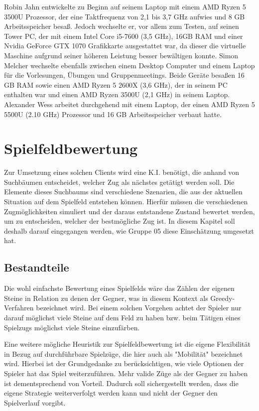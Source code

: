 \documentclass[12pt,a4paper,bibliography=totocnumbered,listof=totocnumbered]{article}
\begin{document}
Robin Jahn entwickelte zu Beginn auf seinem Laptop mit einem AMD Ryzen 5 3500U Prozessor, der eine Taktfrequenz von 2,1 bis 3,7 GHz aufwies und 8 GB Arbeitsspeicher besaß. Jedoch wechselte er, vor allem zum Testen, auf seinen Tower PC, der mit einem Intel Core i5-7600 (3,5 GHz), 16GB RAM und einer Nvidia GeForce GTX 1070 Grafikkarte ausgestattet war, da dieser die virtuelle Maschine aufgrund seiner höheren Leistung besser bewältigen konnte. Simon Melcher wechselte ebenfalls zwischen einem Desktop Computer und einem Laptop für die Vorlesungen, Übungen und Gruppenmeetings. Beide Geräte besaßen 16 GB RAM sowie einen AMD Ryzen 5 2600X (3,6 GHz), der in seinem PC enthalten war und einen AMD Ryzen 3500U (2,1 GHz) in seinem Laptop. Alexander Wess arbeitet durchgehend mit einem Laptop, der einen AMD Ryzen 5 5500U (2.10 GHz) Prozessor und 16 GB Arbeitsspeicher verbaut hatte.

\newpage
\section{Spielfeldbewertung} \label{kap:Spielfeldbewertung}
Zur Umsetzung eines solchen Clients wird eine K.I. benötigt, die anhand von Suchbäumen entscheidet, welcher Zug als nächstes getätigt werden soll. Die Elemente dieses Suchbaums sind verschiedene Szenarien, die aus der aktuellen Situation auf dem Spielfeld entstehen können. Hierfür müssen die verschiedenen Zugmöglichkeiten simuliert und der daraus entstandene Zustand bewertet werden, um zu entscheiden, welcher der bestmögliche Zug ist.
In diesem Kapitel soll deshalb darauf eingegangen werden, wie Gruppe 05 diese Einschätzung umgesetzt hat.

\subsection{Bestandteile}\label{kap:Heuristik_Beschreibung}
Die wohl einfachste Bewertung eines Spielfelds wäre das Zählen der eigenen Steine in Relation zu denen der Gegner, was in diesem Kontext als Greedy-Verfahren bezeichnet wird. Bei einem solchen Vorgehen achtet der Spieler nur darauf möglichst viele Steine auf dem Feld zu haben bzw. beim Tätigen eines Spielzugs möglichst viele Steine einzufärben.

Eine weitere mögliche Heuristik zur Spielfeldbewertung ist die eigene Flexibilität in Bezug auf durchführbare Spielzüge, die hier auch als "Mobilität" bezeichnet wird. Hierbei ist der Grundgedanke zu berücksichtigen, wie viele Optionen der Spieler hat das Spiel weiterzuführen. Mehr valide Züge als der Gegner zu haben ist dementsprechend von Vorteil. Dadurch soll sichergestellt werden, dass die eigene Strategie weiterverfolgt werden kann und nicht der Gegner den Spielverlauf vorgibt.
\end{document}
